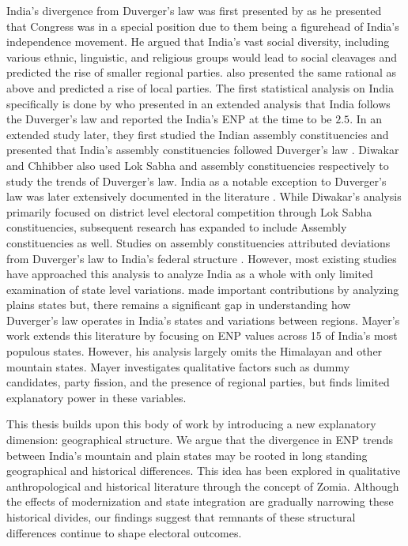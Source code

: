 \begin{sloppypar}
 India's divergence from Duverger's law was first presented by \cite{lijphart1994} as he presented that Congress was in a special position due to them being a figurehead of India's independence movement. He argued that India's vast social diversity, including various ethnic, linguistic, and religious groups would lead to social cleavages and predicted the rise of smaller regional parties. \cite{taagepera1989seats,sridharan1997duverger} also presented the same rational as above and predicted a rise of local parties. The first statistical analysis on India specifically is done by \cite{chhibber1998party} who presented in an extended analysis that India follows the Duverger's law and reported the India's ENP at the time to be $2.5$. In an extended study later, they first studied the Indian assembly constituencies and presented that India's assembly constituencies followed Duverger's law \citep{chhibber2009formation}. Diwakar and Chhibber also used Lok Sabha and assembly constituencies respectively to study the trends of Duverger’s law. 
India as a notable exception to Duverger's law was later extensively documented in the literature \citep{diwakar2007duverger, diwakar2010party, mayer2013gross,carneggie_duverger}. While Diwakar's analysis primarily focused on district level electoral competition through Lok Sabha constituencies, subsequent research has expanded to include Assembly constituencies as well. Studies on assembly constituencies attributed deviations from Duverger's law to India's federal structure \citep{chhibber2006duvergerian}. However, most existing studies have approached this analysis to analyze India as a whole with only limited examination of state level variations. \cite{mayer2013gross} made important contributions by analyzing plains states but, there remains a significant gap in understanding how Duverger's law operates in India's states and variations between regions.   Mayer's work extends this literature by focusing on ENP values across 15 of India's most populous states. However, his analysis largely omits the Himalayan and other mountain states. Mayer  investigates qualitative factors such as dummy candidates, party fission, and the presence of regional parties, but finds limited explanatory power in these variables. 

This thesis builds upon this body of work by introducing a new explanatory dimension: geographical structure. We argue that the divergence in ENP trends between India's mountain and plain states may be rooted in long standing geographical and historical differences. This  idea has been explored in qualitative anthropological and historical literature through the concept of Zomia. Although the effects of modernization and state integration are gradually narrowing these historical divides, our findings suggest that remnants of these structural differences continue to shape electoral outcomes.



\end{sloppypar}

